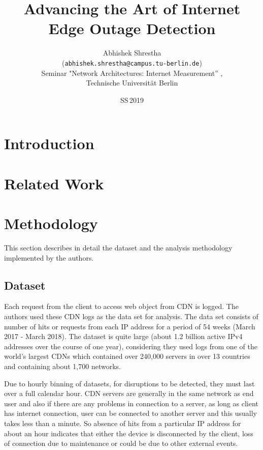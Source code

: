 \documentclass[11pt,twoside,a4paper]{article}
\begin{document}

\title{Advancing the Art of Internet Edge Outage Detection}
\author{Abhishek Shrestha \\
  (\texttt{abhishek.shrestha@campus.tu-berlin.de})\\[5mm]
  Seminar "Network Architectures: Internet Measurement'' , \\	%
 Technische Universit{\"a}t Berlin
}
  
\date{SS\,2019}

\maketitle

\section{Introduction}


\section{Related Work}\label{RW}

\section{Methodology}  \label{M}
This section describes in detail the dataset and the analysis methodology implemented by the authors.

\subsection{Dataset}
Each request from the client to access web object from CDN is logged. The authors used these CDN logs as the data set for analysis. The data set consists of number of hits or requests from each IP address for a period of 54 weeks (March 2017 - March 2018). The dataset is quite large (about 1.2 billion active IPv4 addresses over the course of one year),  considering they used logs from one of the world's largest CDNs which contained over 240,000 servers in over 13 countries and containing about 1,700 networks.

Due to hourly binning of datasets, for disruptions to be detected, they must last over a full calendar hour. CDN servers are generally in the same network as end user and also if there are any problems in connection to a server, as long as client has internet connection, user can be connected to another server and this usually takes less than a minute. So absence of hits from a particular IP address for about an hour indicates that either the device is disconnected by the client, loss of connection due to maintenance or could be due to other external events. 
\end{document}
